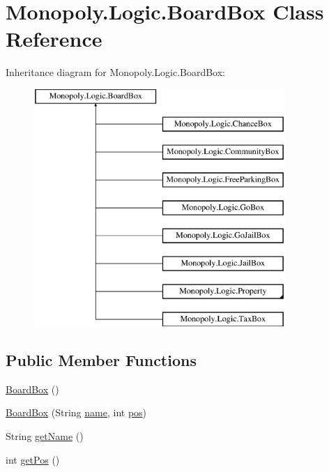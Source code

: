 \hypertarget{class_monopoly_1_1_logic_1_1_board_box}{}\section{Monopoly.\+Logic.\+Board\+Box Class Reference}
\label{class_monopoly_1_1_logic_1_1_board_box}
Inheritance diagram for Monopoly.\+Logic.\+Board\+Box\+:\begin{figure}[H]
\begin{center}
\leavevmode
\includegraphics[height=9.000000cm]{class_monopoly_1_1_logic_1_1_board_box}
\end{center}
\end{figure}
\subsection*{Public Member Functions}
\begin{DoxyCompactItemize}
\item 
\hyperlink{class_monopoly_1_1_logic_1_1_board_box_aaba7b92a6d29974b897cca4aff9ad70f}{Board\+Box} ()
\item 
\hyperlink{class_monopoly_1_1_logic_1_1_board_box_afaca40383c3c6adf9e5ae82a2a0c0206}{Board\+Box} (String \hyperlink{class_monopoly_1_1_logic_1_1_board_box_ad5cd8d9fc191dc2df82b9fe7766210fd}{name}, int \hyperlink{class_monopoly_1_1_logic_1_1_board_box_a750c8300a134809e0eb5772b3ba92258}{pos})
\item 
String \hyperlink{class_monopoly_1_1_logic_1_1_board_box_a9b1e529489b5008b15172035b40bdec9}{get\+Name} ()
\item 
int \hyperlink{class_monopoly_1_1_logic_1_1_board_box_a4cb9795a6df15b45d01640a2a43499d9}{get\+Pos} ()
\end{DoxyCompactItemize}
